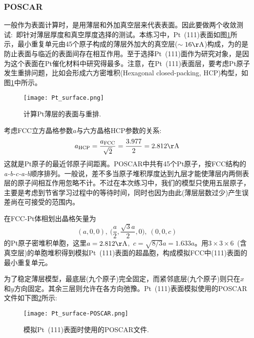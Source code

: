 \subsubsection{\rm{POSCAR}}
一般作为表面计算时，是用薄层和外加真空层来代表表面。因此要做两个收敛测试:~即针对薄层厚度和真空厚度选择的测试。本练习中，\textrm{Pt~(111)}表面如图\ref{Pt_surface}所示，最小重复单元由45个原子构成的薄层外加大的真空层($\sim16\mathrm{\AA}$)构成，为的是防止表面与临近的表面间存在相互作用。至于选择\textrm{Pt~(111)}面作为研究对象，是因为这个表面在\textrm{Pt}催化材料中研究得最多。注意，在\textrm{Pt~(111)}表面层，要考虑\textrm{Pt}原子发生重排问题，比如会形成六方密堆积\textrm{(Hexagonal closed-packing, HCP)}构型，如图\ref{Pt_surface}中所示。
\begin{figure}[h!]
\centering
\texttt{[image: Pt\_surface.png]}
\caption{\small \textrm{计算\textrm{Pt}薄层的表面与重排.}}%
\label{Pt_surface}
\end{figure}

考虑\textrm{FCC}立方晶格参数$a$与六方晶格\textrm{HCP}参数的关系:~
\begin{displaymath}
	a_{\mathrm{HCP}}=\dfrac{a_{\mathrm{FCC}}}{\sqrt2}=\dfrac{3.977}2=2.812\mathrm{\AA}
\end{displaymath}
这就是\textrm{Pt}原子的最近邻原子间距离。\textrm{POSCAR}中共有45个\textrm{Pt}原子，按\textrm{FCC}结构的\textit{a-b-c-a-b}顺序排列。一般说，差不多当原子堆积厚度达到九层才能使薄层内两侧表层的原子间相互作用忽略不计。不过在本次练习中，我们的模型只使用五层原子，主要是考虑到节省学习过程中的等待时间，同时也因为由此(薄层层数过少)产生误差尚在可接受的范围内。

在\textrm{FCC-Pt}体相划出晶格矢量为
\begin{displaymath}
	(a,0,0),~\bigg(\dfrac a2,\dfrac{\sqrt3a}2,0\bigg),~(0,0,c)
\end{displaymath}
的\textrm{Pt}原子密堆积单胞，这里$a=2.812\mathrm{\AA}$,~$c=\sqrt{8/3}a=1.633a$。用$3\times3\times6$~(含真空层)的单胞堆积得到模拟\textrm{Pt~(111)}表面的超晶胞，构成模拟\textrm{FCC}中\textrm{(111)}表面的最小重复单元。

为了稳定薄层模型，最底层(九个原子)完全固定，而紧邻底层(九个原子)则只在$x$和$y$方向固定。其余三层则允许在各方向弛豫。\textrm{Pt~(111)}表面模拟使用的\textrm{POSCAR}文件如下图\ref{Pt_surface-POSCAR}所示:
\begin{figure}[h!]
\centering
\texttt{[image: Pt\_surface-POSCAR.png]}
\caption{\small \textrm{模拟\textrm{Pt~(111)}表面时使用的\textrm{POSCAR}文件.}}%
\label{Pt_surface-POSCAR}
\end{figure}

